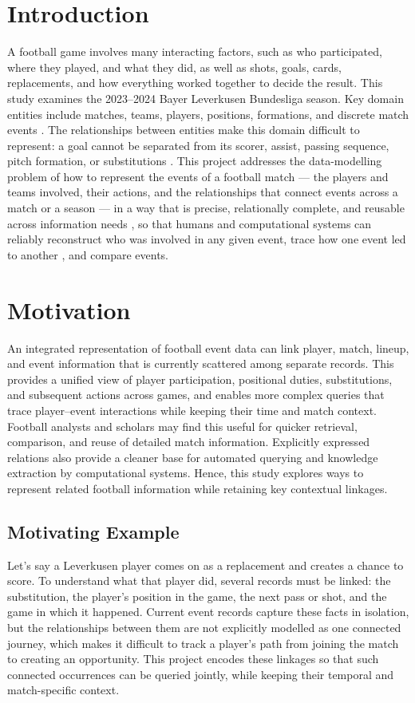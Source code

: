 \documentclass[sigconf,nonacm]{acmart}
\begin{document}
\section{Introduction}
A football game involves many interacting factors, such as who participated,
where they played, and what they did, as well as shots, goals, cards,
replacements, and how everything worked together to decide the result. This
study examines the 2023--2024 Bayer Leverkusen Bundesliga season. Key domain
entities include matches, teams, players, positions, formations, and discrete
match events \cite{schemaorg}. The relationships between entities make this
domain difficult to represent: a goal cannot be separated from its scorer,
assist, passing sequence, pitch formation, or substitutions
\cite{statsbomb-match}. This project addresses the data-modelling problem of
how to represent the events of a football match --- the players and teams
involved, their actions, and the relationships that connect events across a
match or a season --- in a way that is precise, relationally complete, and
reusable across information needs \cite{cdf2025}, so that humans and
computational systems can reliably reconstruct who was involved in any given
event, trace how one event led to another \cite{provo}, and compare events.

\section{Motivation}
An integrated representation of football event data can link player, match,
lineup, and event information that is currently scattered among separate
records. This provides a unified view of player participation, positional
duties, substitutions, and subsequent actions across games, and enables more
complex queries that trace player--event interactions while keeping their time
and match context. Football analysts and scholars may find this useful for
quicker retrieval, comparison, and reuse of detailed match information.
Explicitly expressed relations also provide a cleaner base for automated
querying and knowledge extraction by computational systems. Hence, this study
explores ways to represent related football information while retaining key
contextual linkages.

\subsection{Motivating Example}
Let's say a Leverkusen player comes on as a replacement and creates a chance to score. To understand what that player did, several records must be linked: the
substitution, the player's position in the game, the next pass or shot, and
the game in which it happened. Current event records capture these facts in
isolation, but the relationships between them are not explicitly modelled as
one connected journey, which makes it difficult to track a player's path from
joining the match to creating an opportunity. This project encodes these
linkages so that such connected occurrences can be queried jointly, while
keeping their temporal and match-specific context.
\end{document}
